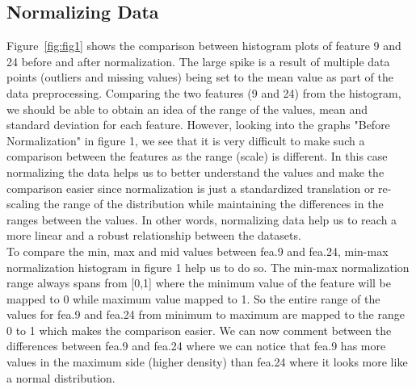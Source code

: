\subsection{Normalizing Data}
Figure~\ref{fig:fig1} shows the comparison between histogram plots of feature 9 and 24 before and after normalization. The large spike is a result of multiple data points (outliers and missing values) being set to the mean value as part of the data preprocessing. 
Comparing the two features (9 and 24) from the histogram, we should be able to obtain an idea of the range of the values, mean and standard deviation for each feature. However, looking into the graphs "Before Normalization" in figure 1, we see that it is very difficult to make such a comparison between the features as the range (scale) is different. In this case normalizing the data helps us to better understand the values and make the comparison easier since normalization is just a standardized translation or re-scaling the range of the distribution while maintaining the differences in the ranges between the values. In other words, normalizing data help us to reach a more linear and a robust relationship between the datasets.
\\
To compare the min, max and mid values between fea.9 and fea.24, min-max normalization histogram in figure 1 help us to do so. The min-max normalization range always spans from [0,1] where the minimum value of the feature will be mapped to 0 while maximum value mapped to 1. So the entire range of the values for fea.9 and fea.24 from minimum to maximum are mapped to the range 0 to 1 which makes the comparison easier. We can now comment between the differences between fea.9 and fea.24 where we can notice that fea.9 has more values in the maximum side (higher density) than fea.24 where it looks more like a normal distribution.
